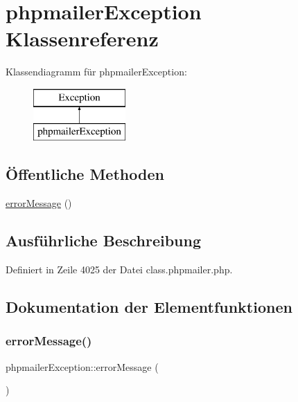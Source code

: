 \hypertarget{classphpmailer_exception}{}\section{phpmailer\+Exception Klassenreferenz}
\label{classphpmailer_exception}
Klassendiagramm für phpmailer\+Exception\+:\begin{figure}[H]
\begin{center}
\leavevmode
\includegraphics[height=2.000000cm]{classphpmailer_exception}
\end{center}
\end{figure}
\subsection*{Öffentliche Methoden}
\begin{DoxyCompactItemize}
\item 
\mbox{\hyperlink{classphpmailer_exception_aeea8c4a8f2abac4f1ca70c6beb4d356d}{error\+Message}} ()
\end{DoxyCompactItemize}


\subsection{Ausführliche Beschreibung}


Definiert in Zeile 4025 der Datei class.\+phpmailer.\+php.



\subsection{Dokumentation der Elementfunktionen}
\mbox{\label{classphpmailer_exception_aeea8c4a8f2abac4f1ca70c6beb4d356d}} 
\subsubsection{\texorpdfstring{error\+Message()}{errorMessage()}}
{\footnotesize\ttfamily phpmailer\+Exception\+::error\+Message (\begin{DoxyParamCaption}{ }\end{DoxyParamCaption})}

